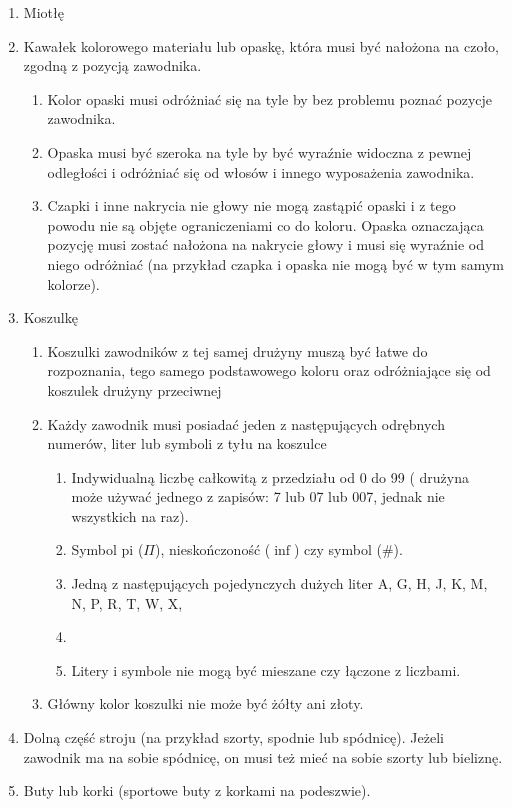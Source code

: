 \documentclass[12pt]{article}
\begin{document}
\begin{enumerate}
\item
    Miotłę
  \item
    Kawałek kolorowego materiału lub opaskę, która musi być nałożona na
  czoło, zgodną z pozycją zawodnika.
  
  \begin{enumerate}
  \item
        Kolor opaski musi odróżniać się na tyle by bez problemu poznać
    pozycje zawodnika.
      \item
        Opaska musi być szeroka na tyle by być wyraźnie widoczna z pewnej
    odległości i odróżniać się od włosów i innego wyposażenia zawodnika.
      \item
        Czapki i inne nakrycia nie głowy nie mogą zastąpić opaski i z tego
    powodu nie są objęte ograniczeniami co do koloru. Opaska oznaczająca
    pozycję musi zostać nałożona na nakrycie głowy i musi się wyraźnie
    od niego odróżniać (na przykład czapka i opaska nie mogą być w tym
    samym kolorze).
      \end{enumerate}
\item
    Koszulkę
  
  \begin{enumerate}
  \item
        Koszulki zawodników z tej samej drużyny muszą być łatwe do
    rozpoznania, tego samego podstawowego koloru oraz odróżniające się
    od koszulek drużyny przeciwnej
      \item
        Każdy zawodnik musi posiadać jeden z następujących odrębnych
    numerów, liter lub symboli z tyłu na koszulce
    
    \begin{enumerate}
    \item
            Indywidualną liczbę całkowitą z przedziału od 0 do 99 ( drużyna
      może używać jednego z zapisów: 7 lub 07 lub 007, jednak nie
      wszystkich na raz).
          \item
            Symbol pi ($\Pi$), nieskończoność ($\inf$) czy symbol (\#).
          \item
            Jedną z następujących pojedynczych dużych liter A, G, H, J, K, M,
      N, P, R, T, W, X, \item
          \item
            Litery i symbole nie mogą być mieszane czy łączone z liczbami.
          \end{enumerate}
  \item
        Główny kolor koszulki nie może być żółty ani złoty.
      \end{enumerate}
\item
    Dolną część stroju (na przykład szorty, spodnie lub spódnicę). Jeżeli
  zawodnik ma na sobie spódnicę, on musi też mieć na sobie szorty lub
  bieliznę.
  \item
    Buty lub korki (sportowe buty z korkami na podeszwie).
  

\end{enumerate}
\end{document}
